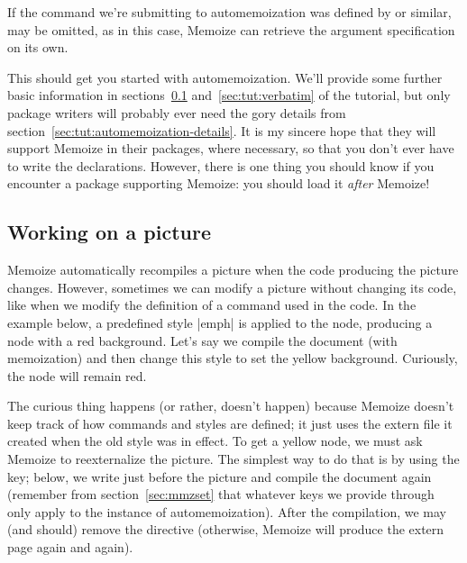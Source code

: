\documentclass[a4paper,11pt]{article}
\begin{document}
If the command we're submitting to automemoization was defined by
 or similar,  may be omitted, as in
this case, Memoize can retrieve the argument specification on its own.

This should get you started with automemoization.  We'll provide some further
basic information in sections~\ref{sec:tut:working-on-a-picture}
and~\ref{sec:tut:verbatim} of the tutorial, but only package writers will
probably ever need the gory details from
section~\ref{sec:tut:automemoization-details}.  It is my sincere hope that they
will support Memoize in their packages, where necessary, so that you don't ever
have to write the  declarations.  However, there is one thing you
should know if you encounter a package supporting Memoize: you should load it
\emph{after} Memoize!



\subsection{Working on a picture}
\label{sec:tut:working-on-a-picture}


Memoize automatically recompiles a picture when the code producing the picture
changes.  However, sometimes we can modify a picture without changing its code,
like when we modify the definition of a command used in the code.  In the
example below, a predefined style |emph| is applied to the node, producing a
node with a red background.  Let's say we compile the document (with
memoization) and then change this style to set the yellow background.
Curiously, the node will remain red.

\begin{tcbraster}[raster columns=2, raster valign=top, raster column skip=4mm]
\end{tcbraster}

The curious thing happens (or rather, doesn't happen) because Memoize doesn't
keep track of how commands and styles are defined; it just uses the extern file
it created when the old style was in effect.  To get a yellow node, we must ask
Memoize to reexternalize the picture.  The simplest way to do that is by using
the  key; below, we write
 just before the picture and
compile the document again (remember from section~\ref{sec:mmzset} that
whatever keys we provide through  only apply to the instance of
automemoization).  After the compilation, we may (and should) remove the
 directive (otherwise, Memoize will produce the extern page
again and again).
\end{document}
